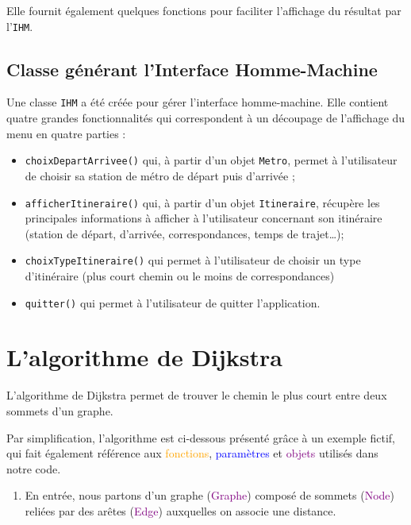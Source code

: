 \documentclass[,french]{article}
\providecommand{\tightlist}{%
  \setlength{\itemsep}{0pt}\setlength{\parskip}{0pt}}
\begin{document}
Elle fournit également quelques fonctions pour faciliter l'affichage du
résultat par l'\texttt{IHM}.

\hypertarget{classe-guxe9nuxe9rant-linterface-homme-machine}{%
\subsection{Classe générant l'Interface
Homme-Machine}\label{classe-guxe9nuxe9rant-linterface-homme-machine}}

Une classe \texttt{IHM} a été créée pour gérer l'interface
homme-machine. Elle contient quatre grandes fonctionnalités qui
correspondent à un découpage de l'affichage du menu en quatre parties :

\begin{itemize}
\item
  \texttt{choixDepartArrivee()} qui, à partir d'un objet \texttt{Metro},
  permet à l'utilisateur de choisir sa station de métro de départ puis
  d'arrivée ;
\item
  \texttt{afficherItineraire()} qui, à partir d'un objet
  \texttt{Itineraire}, récupère les principales informations à afficher
  à l'utilisateur concernant son itinéraire (station de départ,
  d'arrivée, correspondances, temps de trajet\ldots{});
\item
  \texttt{choixTypeItineraire()} qui permet à l'utilisateur de choisir
  un type d'itinéraire (plus court chemin ou le moins de
  correspondances)
\item
  \texttt{quitter()} qui permet à l'utilisateur de quitter
  l'application.
\end{itemize}

\hypertarget{sec:algo}{%
\section{L'algorithme de Dijkstra}\label{sec:algo}}

L'algorithme de Dijkstra permet de trouver le chemin le plus court entre
deux sommets d'un graphe.

Par simplification, l'algorithme est ci-dessous présenté grâce à un
exemple fictif, qui fait également référence aux
\textcolor{orange}{fonctions}, \textcolor{blue}{paramètres} et
\textcolor{purple}{objets} utilisés dans notre code.

\begin{enumerate}
\def\labelenumi{\arabic{enumi}.}
\tightlist
\item
  En entrée, nous partons d'un graphe (\textcolor{purple}{Graphe})
  composé de sommets (\textcolor{purple}{Node}) reliées par des arêtes
  (\textcolor{purple}{Edge}) auxquelles on associe une distance.
\end{enumerate}
\end{document}
